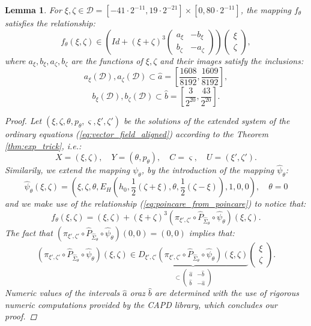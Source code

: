 \documentclass[1p]{article}
\newtheorem{lemma}{Lemma}
\begin{document}
\begin{lemma}
    \label{lem:f_theta_in_D}
    For $\xi, \zeta \in \mathcal{D} = \left[ -41 \cdot 2^{-11}, 19 \cdot 2^{-21} \right] \times [0, 80 \cdot 2^{-11}]$, the mapping $f_\theta$ satisfies the relationship:
    \[
        f_\theta (\xi, \zeta) \in 
        \left(Id + (\xi + \zeta)^3 \begin{pmatrix} a_\xi & -b_\xi \\ b_\zeta & -a_\zeta \end{pmatrix} \right) \begin{pmatrix} \xi \\ \zeta \end{pmatrix},
    \]
    where $a_\xi, b_\xi, a_\zeta, b_\zeta$ are the functions of $\xi, \zeta$ and their images satisfy the inclusions:
    \[
        a_\xi \left( \mathcal{D} \right), a_\zeta \left( \mathcal{D} \right) \subset \hat{a} = \left[ \frac{1608}{8192}, \frac{1609}{8192} \right],
    \]
    \[
        b_\xi \left( \mathcal{D} \right), b_\zeta \left( \mathcal{D} \right) \subset \hat{b} = \left[ \frac{3}{2^{20}}, \frac{43}{2^{20}} \right].
    \]
    \begin{proof}
        Let $(\xi, \zeta, \theta, p_\theta, \varsigma, \xi', \zeta')$ be the solutions of the extended system of the ordinary equations (\ref{eq:vector_field_aligned}) according to the Theorem \ref{thm:exp_trick}, i.e.:
        \[
            X = (\xi, \zeta), \quad Y = (\theta, p_\theta), \quad C = \varsigma, \quad U = (\xi', \zeta').
        \]
        Similarily, we extend the mapping $\psi_\theta$, by the introduction of the mapping $\hat{\psi}_\theta$:
        \[
            \hat{\psi}_\theta (\xi, \zeta) = \left(\xi, \zeta, \theta, E_H \left( h_0, \frac{1}{2} (\zeta + \xi), \theta, \frac{1}{2} (\zeta - \xi) \right), 1, 0, 0 \right), \quad \theta = 0
        \]
        and we make use of the relationship (\ref{eq:poincare_from_poincare}) to notice that:
        \[
            f_\theta (\xi, \zeta) =
                (\xi, \zeta) + (\xi + \zeta)^3 \left( \pi_{\xi', \zeta'} \circ \hat{P}_{\hat{\Sigma}_\theta} \circ \hat{\psi}_\theta \right) (\xi, \zeta).
        \]
        The fact that $\left( \pi_{\xi', \zeta'} \circ \hat{P}_{\hat{\Sigma}_\theta} \circ \hat{\psi}_\theta \right)(0,0) = (0,0)$ implies that:
        \[
            \left( \pi_{\xi', \zeta'} \circ \hat{P}_{\hat{\Sigma}_\theta} \circ \hat{\psi}_\theta \right) (\xi, \zeta) \in 
            \underbrace{D_{\xi', \zeta'} \left( \pi_{\xi', \zeta'} \circ  \hat{P}_{\hat{\Sigma}_\theta} \circ \hat{\psi}_\theta \right) (\xi, \zeta)}_{\subset \begin{pmatrix} \hat{a} & -\hat{b} \\ \hat{b} & -\hat{a} \end{pmatrix} } \begin{pmatrix} \xi \\ \zeta \end{pmatrix}.
        \]
        Numeric values of the intervals $\hat{a}$ oraz $\hat{b}$ are determined with the use of rigorous numeric computations provided by the CAPD library, which concludes our proof.


\end{proof}
\end{lemma}
\end{document}
